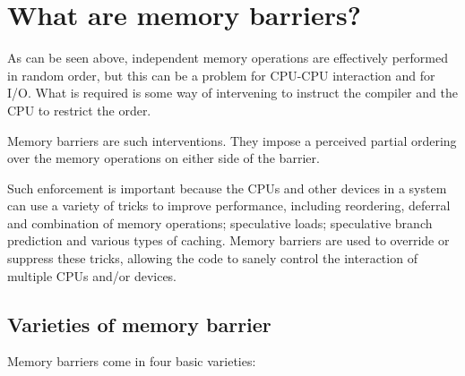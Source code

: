 \section{What are memory barriers?}

As can be seen above, independent memory operations are effectively performed
in random order, but this can be a problem for CPU-CPU interaction and for
I/O\@.
What is required is some way of intervening to instruct the compiler and the
CPU to restrict the order.

Memory barriers are such interventions.
They impose a perceived partial ordering over the memory operations on
either side of the barrier.

Such enforcement is important because the CPUs and other devices in a system
can use a variety of tricks to improve performance, including reordering,
deferral and combination of memory operations; speculative loads; speculative
branch prediction and various types of caching.
Memory barriers are used to override or suppress these tricks, allowing
the code to sanely control the interaction of multiple CPUs and/or devices.

\subsection{Varieties of memory barrier}

Memory barriers come in four basic varieties:

